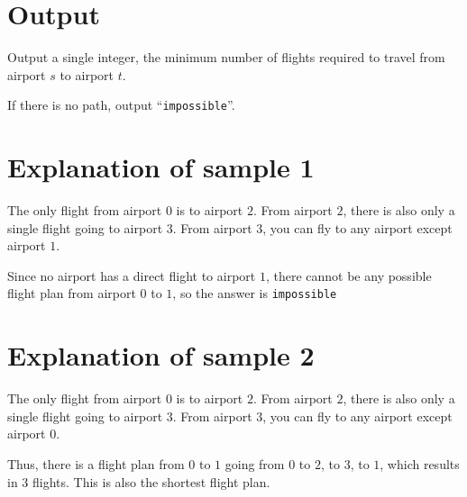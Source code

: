 \section*{Output}
Output a single integer, the minimum number of flights required to travel from airport $s$ to airport $t$.

If there is no path, output ``\texttt{impossible}''.

\section*{Explanation of sample 1}
The only flight from airport $0$ is to airport $2$.
From airport $2$, there is also only a single flight going to airport $3$.
From airport $3$, you can fly to any airport except airport $1$.

Since no airport has a direct flight to airport $1$, there cannot be any possible flight plan from airport $0$ to $1$, so the answer is \texttt{impossible}

\section*{Explanation of sample 2}
The only flight from airport $0$ is to airport $2$.
From airport $2$, there is also only a single flight going to airport $3$.
From airport $3$, you can fly to any airport except airport $0$.

Thus, there is a flight plan from $0$ to $1$ going from $0$ to $2$, to $3$, to $1$, which results in 3 flights.
This is also the shortest flight plan.
